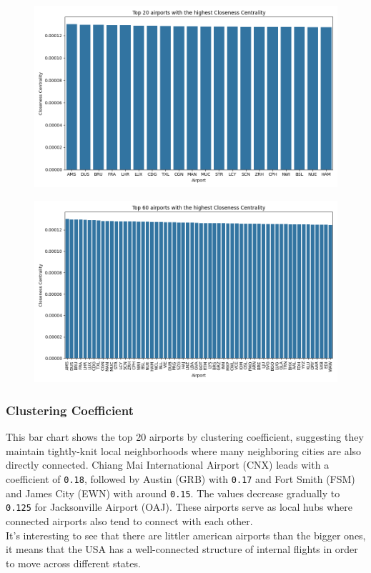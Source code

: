 \documentclass[12pt]{article}
\begin{document}
    \begin{figure}[H]
        \centering
        \includegraphics[width=0.8\linewidth]{img/closeness_centrality}
    \end{figure}
    \begin{figure}[H]
        \centering
        \includegraphics[width=0.8\linewidth]{img/more_closeness_centrality}
    \end{figure}

    \subsubsection{Clustering Coefficient}
    This bar chart shows the top 20 airports by clustering coefficient, suggesting they maintain tightly-knit local neighborhoods where many neighboring cities are also directly connected. Chiang Mai International Airport (CNX) leads with a coefficient of \texttt{0.18}, followed by Austin (GRB) with \texttt{0.17} and Fort Smith (FSM) and James City (EWN) with around \texttt{0.15}. The values decrease gradually to \texttt{0.125} for Jacksonville Airport (OAJ). These airports serve as local hubs where connected airports also tend to connect with each other.\\
    It's interesting to see that there are littler american airports than the bigger ones, it means that the USA has a well-connected structure of internal flights in order to move across different states.
\end{document}
